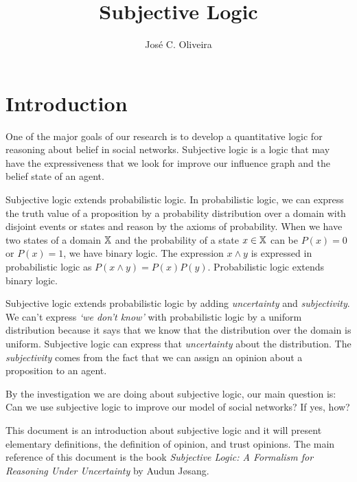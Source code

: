 \documentclass[a4paper,12pt]{article}
\title{Subjective Logic}
\author{José C. Oliveira}
\theoremstyle{definition}
\numberwithin{equation}{section}
\newcommand{\qm}[1]{`#1'}
\begin{document}
\maketitle

\section{Introduction}

One of the major goals of our research is to develop a quantitative logic for reasoning about belief in social networks. Subjective logic is a logic that may have the expressiveness that we look for improve our influence graph and the belief state of an agent.

Subjective logic extends probabilistic logic. In probabilistic logic, we can express the truth value of a proposition by a probability distribution over a domain with disjoint events or states and reason by the axioms of probability. When we have two states of a domain $\mathbb{X}$ and the probability of a state $x \in \mathbb{X}$ can be $P(x) = 0$ or $P(x) = 1$, we have binary logic. The expression $x \land y$ is expressed in probabilistic logic as $P(x \land y) = P(x)P(y)$. Probabilistic logic extends binary logic.

Subjective logic extends probabilistic logic by adding \emph{uncertainty} and \emph{subjectivity}. We can't express \emph{\qm{we don't know}} with probabilistic logic by a uniform distribution because it says that we know that the distribution over the domain is uniform. Subjective logic can express that \emph{uncertainty} about the distribution. The \emph{subjectivity} comes from the fact that we can assign an opinion about a proposition to an agent.

By the investigation we are doing about subjective logic, our main question is: Can we use subjective logic to improve our model of social networks? If yes, how?

This document is an introduction about subjective logic and it will present elementary definitions, the definition of opinion, and trust opinions. The main reference of this document is the book \emph{Subjective Logic: A Formalism for Reasoning Under Uncertainty} by Audun Jøsang.


%	
%	
%	
\end{document}
